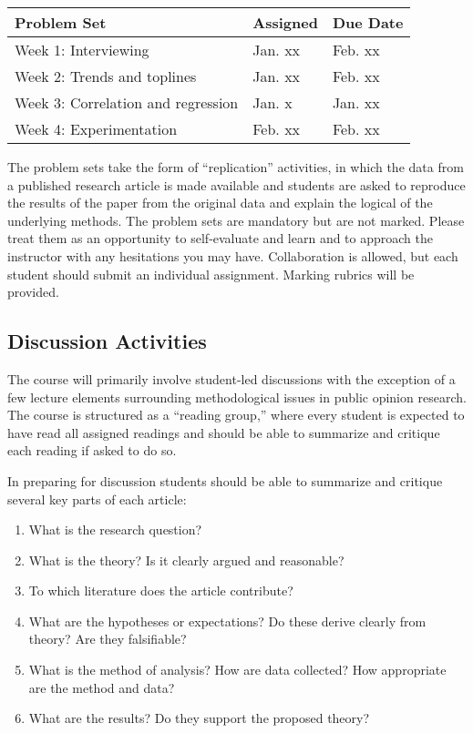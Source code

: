 \documentclass[12pt,a4paper]{article}
\begin{document}
\begin{center}
\begin{tabular}{lll} \hline
\textbf{Problem Set} & \textbf{Assigned} & \textbf{Due Date} \\ \hline
Week 1: Interviewing & Jan. xx & Feb. xx \\
Week 2: Trends and toplines & Jan. xx & Feb. xx \\
Week 3: Correlation and regression & Jan. x & Jan. xx \\
Week 4: Experimentation & Feb. xx & Feb. xx \\ \hline
\end{tabular}
\end{center}

The problem sets take the form of ``replication'' activities, in which the data from a published research article is made available and students are asked to reproduce the results of the paper from the original data and explain the logical of the underlying methods. The problem sets are mandatory but are not marked. Please treat them as an opportunity to self-evaluate and learn and to approach the instructor with any hesitations you may have. Collaboration is allowed, but each student should submit an individual assignment. Marking rubrics will be provided.

\subsection{Discussion Activities}

The course will primarily involve student-led discussions with the exception of a few lecture elements surrounding methodological issues in public opinion research. The course is structured as a ``reading group,'' where every student is expected to have read all assigned readings and should be able to summarize and critique each reading if asked to do so.

In preparing for discussion students should be able to summarize and critique several key parts of each article:

\begin{enumerate}
\item What is the research question?
\item What is the theory? Is it clearly argued and reasonable?
\item To which literature does the article contribute?
\item What are the hypotheses or expectations? Do these derive clearly from theory? Are they falsifiable?
\item What is the method of analysis? How are data collected? How appropriate are the method and data?
\item What are the results? Do they support the proposed theory?
\end{enumerate}
\end{document}
